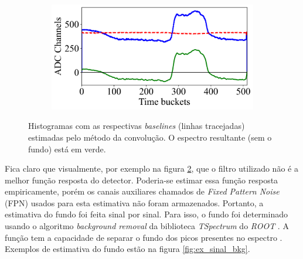 \documentclass[a4paper,12pt,oneside]{book}
\begin{document}
\begin{figure}[H]
\begin{subfigure}[b]{0.45\textwidth}
        \caption{}
        \label{subfig:bs_fourier_3}
    \end{subfigure}%
    \hfill
    \begin{subfigure}[b]{0.45\textwidth}
        \centering
        \includegraphics[scale=0.42]{figs/bs_fourier_4.png}
        \caption{}
        \label{subfig:bs_fourier_4}
    \end{subfigure}
\caption{Histogramas com as respectivas \textit{baselines} (linhas tracejadas) estimadas pelo método da convolução. O espectro resultante (sem o fundo) está em verde.}
\label{fig:bs_fourier_exs}
\end{figure}


\par Fica claro que visualmente, por exemplo na figura \ref{subfig:bs_fourier_4}, que o filtro utilizado não é a melhor função resposta do detector. Poderia-se estimar essa função resposta empiricamente, porém os canais auxiliares chamados de \textit{Fixed Pattern Noise} (FPN) \cite{GET} usados para esta estimativa não foram armazenados. Portanto, a estimativa do fundo foi feita sinal por sinal\cite{FORTINO2022166497, GET}. Para isso, o fundo foi determinado usando o algoritmo \textit{background removal} da biblioteca \textit{TSpectrum} do \textit{ROOT} \cite{root}. A função tem a capacidade de separar o fundo dos picos presentes no espectro \cite{BKG_1, BKG_2, BKG_3}. Exemplos de estimativa do fundo estão na figura \ref{fig:ex_sinal_bkg}.

\end{document}
